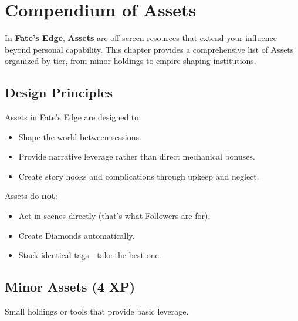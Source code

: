 
\chapter{Compendium of Assets}

In \textbf{Fate’s Edge}, \textbf{Assets} are off-screen resources that extend your influence beyond personal capability. This chapter provides a comprehensive list of Assets organized by tier, from minor holdings to empire-shaping institutions.

\section{Design Principles}

Assets in Fate’s Edge are designed to:

\begin{itemize}
  \item Shape the world between sessions.
  \item Provide narrative leverage rather than direct mechanical bonuses.
  \item Create story hooks and complications through upkeep and neglect.
\end{itemize}

Assets do \textbf{not}:
\begin{itemize}
  \item Act in scenes directly (that's what Followers are for).
  \item Create Diamonds automatically.
  \item Stack identical tags—take the best one.
\end{itemize}

\section{Minor Assets (4 XP)}

Small holdings or tools that provide basic leverage.


